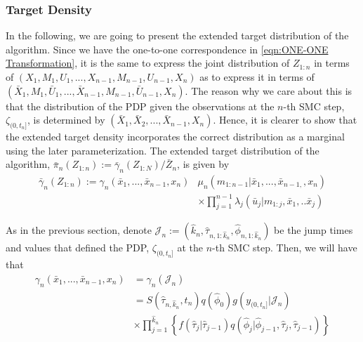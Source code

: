 \documentclass[12pt,a4paper]{article}
\begin{document}
\subsubsection{Target Density}
In the following, we are going to present the extended target distribution of the algorithm. Since we have the one-to-one correspondence in \eqref{eqn:ONE-ONE Transformation}, it is the same to express the joint distribution of $Z_{1:n}$ in terms of 
$\left(X_1,M_1,U_1,...,X_{n-1},M_{n-1},U_{n-1},X_n\right)$ as to express it in terms of $\left(\bar{X}_{1},M_{1},\bar{U}_{1},...,\bar{X}_{n-1},M_{n-1}, \allowbreak \bar{U}_{n-1},X_n\right)$. The reason why we care about this is that the distribution of the PDP given the observations at the $n$-th SMC step, $\zeta_{(0,t_n]}$, is determined by $\left(\bar{X}_{1},\bar{X}_{2},...,\bar{X}_{n-1},X_n\right)$. Hence, it is clearer to show that the extended target density incorporates the correct distribution as a marginal using the later parameterization. The extended target distribution of the algorithm, $\bar{\pi}_n(Z_{1:n}) := \bar{\gamma}_n(Z_{1:N})/\bar{Z}_n$, is given by
\begin{equation}
    \label{Block-VRPF Target}
    \begin{split}
        \bar{\gamma}_n\left(Z_{1:n}\right) := \gamma_n\left(\bar{x}_{1},...,\bar{x}_{n-1},x_n\right)&\mu_n\left(m_{1:n-1}|\bar{x}_{1},...,\bar{x}_{n-1,},x_n\right)\\
        & \times \prod_{j=1}^{n-1} \lambda_j\left(\bar{u}_{j} | m_{1:j},\bar{x}_{1},..\bar{x}_{j}\right) 
    \end{split}
\end{equation}

As in the previous section, denote $\mathcal{J}_n := \left(\hat{k}_n,\hat{\tau}_{n,1:\hat{k}_n},\hat{\phi}_{n,1:\hat{k}_n}\right)$ be the jump times and values that defined the PDP, $\zeta_{(0,t_n]}$ at the $n$-th SMC step. Then, we will have that 
\begin{equation*}
    \begin{split}
        \gamma_n\left(\bar{x}_{1},...,\bar{x}_{n-1},x_n\right) &= \gamma_n\left(\mathcal{J}_n\right)\\
        &= S\left(\hat{\tau}_{n,\hat{k}_n},t_n\right)q\left(\hat{\phi}_0\right)g\left(y_{(0,t_n]}|\mathcal{J}_n\right)\\
        & \times \prod_{j=1}^{\hat{k}_n} \left\{f\left(\hat{\tau}_j|\hat{\tau}_{j-1}\right)q\left(\hat{\phi}_{j}|\hat{\phi}_{j-1},\hat{\tau}_{j},\hat{\tau}_{j-1}\right)\right\}
    \end{split}
\end{equation*}
\end{document}
